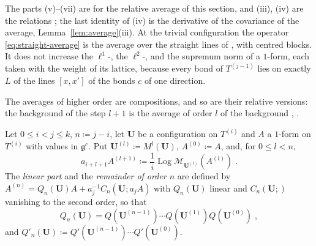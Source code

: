 \documentclass[11pt]{preprint}
\makeatletter
\newcommand*{\bigcdot}{}%
\DeclareRobustCommand*{\bigcdot}{%
	\mathbin{\mathpalette\bigcdot@{}}%
}
\newcommand*{\bigcdot@scalefactor}{.7}
\newcommand*{\bigcdot@widthfactor}{1.15}
\newcommand*{\bigcdot@}[2]{%
	\sbox0{$#1\vcenter{}$}%
	\sbox2{$#1\cdot\m@th$}%
	\hbox to \bigcdot@widthfactor\wd2{%
		\hss
		\raise\ht0\hbox{%
			\scalebox{\bigcdot@scalefactor}{%
				\lower\ht0\hbox{$#1\bullet\m@th$}%
			}%
		}%
		\hss
	}%
}
\numberwithin{equation}{section}
\makeatother
\begin{document}
The parts (v)--(vii) are \cite[Propositions~3--7, (121)--(125)]{BalabanAVG} for the relative average of this section, and (iii), (iv) are the relations \cite[(3.114), (3.115), p.~418]{BalabanPBG}; the last identity of (iv) is the derivative of the covariance of the average, Lemma~\ref{lem:average}(iii). At the trivial configuration the operator \eqref{eq:straight-average} is the average over the straight lines of \cite[(1.18), p.~20]{BalabanPRT1}, with centred blocks. It does not increase the $\ell^1$-, the $\ell^2$-, and the supremum norm of a $1$-form, each taken with the weight of its lattice, because every bond of $T^{(j-1)}$ lies on exactly $L$ of the lines $[x, x']$ of the bonds $c$ of one direction.

The averages of higher order are compositions, and so are their relative versions: the background of the step $l + 1$ is the average of order $l$ of the background \cite[(90), (91), p.~31]{BalabanAVG}, \cite[(3.15), p.~393]{BalabanPBG}.

\begin{definition}\label{def:relative-average-order}
Let $0 \leqslant i < j \leqslant k$, $n \coloneqq j - i$, let $\mathbf U$ be a configuration on $T^{(i)}$ and $A$ a $1$-form on $T^{(i)}$ with values in $\mathfrak g^c$. Put $\mathbf U^{(l)} \coloneqq M^l(\mathbf U)$, $A^{(0)} \coloneqq A$, and, for $0 \leqslant l < n$,
\[
    a_{i+l+1}A^{(l+1)} \coloneqq \frac{1}{i}\operatorname{Log}\mathcal M_{\mathbf U^{(l)}}(A^{(l)})\;.
\]
The \emph{linear part} and the \emph{remainder of order $n$} are defined by $A^{(n)} = Q_n(\mathbf U)A + a_j^{-1}C_n(\mathbf U; a_jA)$ with $Q_n(\mathbf U)$ linear and $C_n(\mathbf U; \bigcdot)$ vanishing to the second order, so that
\begin{equation}\label{eq:composite-linear-part}
    Q_n(\mathbf U) = Q(\mathbf U^{(n-1)})\cdots Q(\mathbf U^{(1)})Q(\mathbf U^{(0)})\;,
\end{equation}
and $Q'_n(\mathbf U) \coloneqq Q'(\mathbf U^{(n-1)})\cdots Q'(\mathbf U^{(0)})$.
\end{definition}
\end{document}
